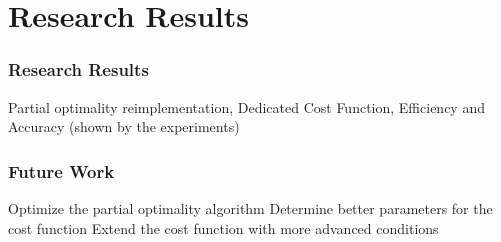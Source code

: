 \section{Research Results}
\frame{\tableofcontents[currentsection]}


\begin{frame}
    \frametitle{Research Results}
    Partial optimality reimplementation, 
    Dedicated Cost Function,
    Efficiency and Accuracy (shown by the experiments) 
\end{frame}


\begin{frame}
    \frametitle{Future Work}
    Optimize the partial optimality algorithm
    Determine better parameters for the cost function
    Extend the cost function with more advanced conditions
\end{frame}



